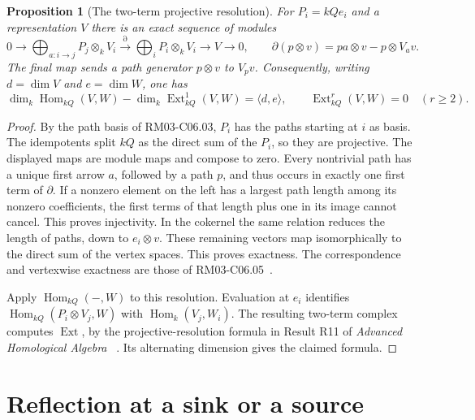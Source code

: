 \documentclass[11pt,oneside,openany]{book}
\newtheorem{proposition}[theorem]{Proposition}
\theoremstyle{definition}
\theoremstyle{remark}
\begin{document}
\begin{proposition}[The two-term projective resolution]
\label{res:QU02}
For \(P_i=kQ e_i\) and a representation \(V\) there is an exact
sequence of modules
\[
 0\longrightarrow \bigoplus_{a:i\to j}P_j\otimes_k V_i
   \xrightarrow{\partial}\bigoplus_i P_i\otimes_k V_i
   \longrightarrow V\longrightarrow0,
 \qquad
 \partial(p\otimes v)=pa\otimes v-p\otimes V_a v .
\]
The final map sends a path generator \(p\otimes v\) to \(V_p v\).
Consequently, writing \(d=\dim V\) and \(e=\dim W\), one has
\[
 \dim_k\operatorname{Hom}_{kQ}(V,W)
   -\dim_k\operatorname{Ext}^1_{kQ}(V,W)=\langle d,e\rangle,
 \qquad \operatorname{Ext}^r_{kQ}(V,W)=0\quad(r\ge2).
\]
\end{proposition}
\begin{proof}
By the path basis of RM03-C06.03, \(P_i\) has the paths starting
at \(i\) as basis. The idempotents split \(kQ\) as the direct sum
of the \(P_i\), so they are projective. The displayed maps are
module maps and compose to zero. Every nontrivial path has a unique
first arrow \(a\), followed by a path \(p\), and thus occurs in
exactly one first term of \(\partial\). If a nonzero element on
the left has a largest path length among its nonzero coefficients,
the first terms of that length plus one in its image cannot cancel.
This proves injectivity. In the cokernel the same relation reduces
the length of paths, down to \(e_i\otimes v\). These remaining
vectors map isomorphically to the direct sum of the vertex spaces.
This proves exactness. The correspondence and vertexwise
exactness are those of RM03-C06.05~\cite[PDF pp.~14--15]{mg-rm03}.

Apply \(\operatorname{Hom}_{kQ}(-,W)\) to this resolution.
Evaluation at \(e_i\) identifies
\(\operatorname{Hom}_{kQ}(P_i\otimes V_j,W)\) with
\(\operatorname{Hom}_k(V_j,W_i)\). The resulting two-term complex
computes \(\operatorname{Ext}\), by the projective-resolution
formula in Result R11 of \emph{Advanced Homological Algebra}
~\cite[PDF p.~32]{mg-ha}. Its alternating dimension gives the
claimed formula.
\end{proof}

\section{Reflection at a sink or a source}
\end{document}

